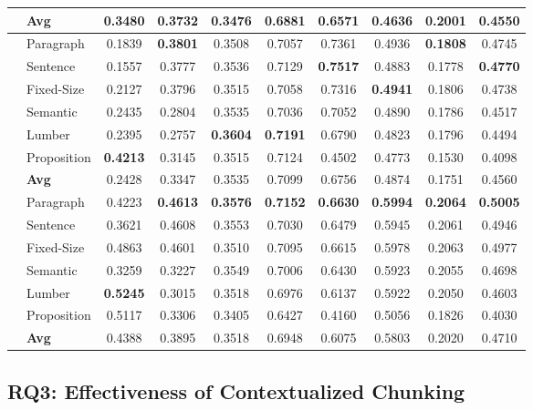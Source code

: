 \begin{table}[htbp]
\begin{tabular}{llcccccccc}
		& \textbf{Avg} & 0.3480 & 0.3732 & 0.3476 & 0.6881 & 0.6571 & 0.4636 & 0.2001 & 0.4550 \\
		\midrule
		\multirow{6}{*}{\rotatebox{90}{\textbf{Nomic}}} & Paragraph & 0.1839 & \textbf{0.3801} & 0.3508 & 0.7057 & 0.7361 & 0.4936 & \textbf{0.1808} & 0.4745 \\
		& Sentence & 0.1557 & 0.3777 & 0.3536 & 0.7129 & \textbf{0.7517} & 0.4883 & 0.1778 & \textbf{0.4770} \\
		& Fixed-Size & 0.2127 & 0.3796 & 0.3515 & 0.7058 & 0.7316 & \textbf{0.4941} & 0.1806 & 0.4738 \\
		& Semantic & 0.2435 & 0.2804 & 0.3535 & 0.7036 & 0.7052 & 0.4890 & 0.1786 & 0.4517 \\
		& Lumber & 0.2395 & 0.2757 & \textbf{0.3604} & \textbf{0.7191} & 0.6790 & 0.4823 & 0.1796 & 0.4494 \\
		& Proposition & \textbf{0.4213} & 0.3145 & 0.3515 & 0.7124 & 0.4502 & 0.4773 & 0.1530 & 0.4098 \\
		& \textbf{Avg} & 0.2428 & 0.3347 & 0.3535 & 0.7099 & 0.6756 & 0.4874 & 0.1751 & 0.4560 \\
		\midrule
		\multirow{6}{*}{\rotatebox{90}{\textbf{E5-Large}}} & Paragraph & 0.4223 & \textbf{0.4613} & \textbf{0.3576} & \textbf{0.7152} & \textbf{0.6630} & \textbf{0.5994} & \textbf{0.2064} & \textbf{0.5005} \\
		& Sentence & 0.3621 & 0.4608 & 0.3553 & 0.7030 & 0.6479 & 0.5945 & 0.2061 & 0.4946 \\
		& Fixed-Size & 0.4863 & 0.4601 & 0.3510 & 0.7095 & 0.6615 & 0.5978 & 0.2063 & 0.4977 \\
		& Semantic & 0.3259 & 0.3227 & 0.3549 & 0.7006 & 0.6430 & 0.5923 & 0.2055 & 0.4698 \\
		& Lumber & \textbf{0.5245} & 0.3015 & 0.3518 & 0.6976 & 0.6137 & 0.5922 & 0.2050 & 0.4603 \\
		& Proposition & 0.5117 & 0.3306 & 0.3405 & 0.6427 & 0.4160 & 0.5056 & 0.1826 & 0.4030 \\
		& \textbf{Avg} & 0.4388 & 0.3895 & 0.3518 & 0.6948 & 0.6075 & 0.5803 & 0.2020 & 0.4710 \\
		\bottomrule
	\end{tabular}
\end{table}




\subsection{RQ3: Effectiveness of Contextualized Chunking}

